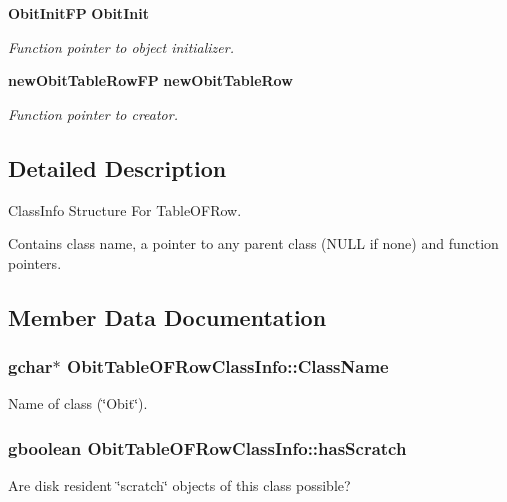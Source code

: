 \begin{CompactItemize}
{\bf Obit\-Init\-FP} {\bf Obit\-Init}
\begin{CompactList}\small\item\em Function pointer to object initializer. \item\end{CompactList}\item 
{\bf new\-Obit\-Table\-Row\-FP} {\bf new\-Obit\-Table\-Row}
\begin{CompactList}\small\item\em Function pointer to creator. \item\end{CompactList}\end{CompactItemize}


\subsection{Detailed Description}
Class\-Info Structure For Table\-OFRow. 

Contains class name, a pointer to any parent class (NULL if none) and function pointers. 



\subsection{Member Data Documentation}
\subsubsection{\setlength{\rightskip}{0pt plus 5cm}gchar$\ast$ {\bf Obit\-Table\-OFRow\-Class\-Info::Class\-Name}}\label{structObitTableOFRowClassInfo_o2}


Name of class (\char`\"{}Obit\char`\"{}). 

\subsubsection{\setlength{\rightskip}{0pt plus 5cm}gboolean {\bf Obit\-Table\-OFRow\-Class\-Info::has\-Scratch}}\label{structObitTableOFRowClassInfo_o1}


Are disk resident \char`\"{}scratch\char`\"{} objects of this class possible? 

